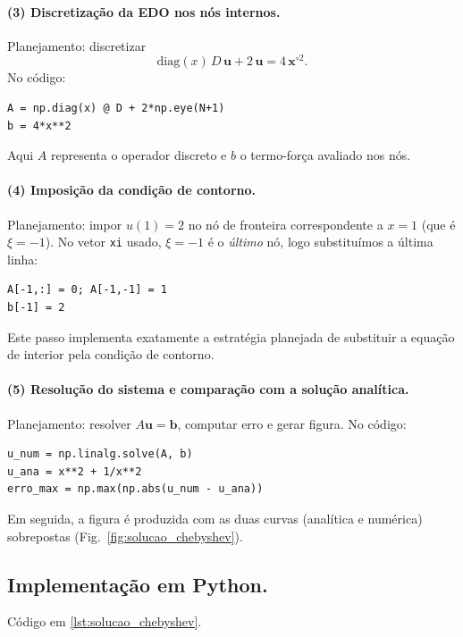 \documentclass[11pt,a4paper]{article}
\begin{document}
\paragraph{(3) Discretização da EDO nos nós internos.}
Planejamento: discretizar
\[
\mathrm{diag}(x)\,D\,\mathbf{u} + 2\,\mathbf{u} = 4\,\mathbf{x}^{\circ 2}.
\]
No código:
\begin{verbatim}
A = np.diag(x) @ D + 2*np.eye(N+1)
b = 4*x**2
\end{verbatim}
Aqui $A$ representa o operador discreto e $b$ o termo-força avaliado nos nós.

\paragraph{(4) Imposição da condição de contorno.}
Planejamento: impor $u(1)=2$ no nó de fronteira correspondente a $x=1$ (que é $\xi=-1$). No vetor \texttt{xi} usado, $\xi=-1$ é o \emph{último} nó, logo substituímos a última linha:
\begin{verbatim}
A[-1,:] = 0; A[-1,-1] = 1
b[-1] = 2
\end{verbatim}
Este passo implementa exatamente a estratégia planejada de substituir a equação de interior pela condição de contorno.

\paragraph{(5) Resolução do sistema e comparação com a solução analítica.}
Planejamento: resolver $A\mathbf{u}=\mathbf{b}$, computar erro e gerar figura.
No código:
\begin{verbatim}
u_num = np.linalg.solve(A, b)
u_ana = x**2 + 1/x**2
erro_max = np.max(np.abs(u_num - u_ana))
\end{verbatim}
Em seguida, a figura é produzida com as duas curvas (analítica e numérica) sobrepostas (Fig.~\ref{fig:solucao_chebyshev}).

\subsection{Implementação em Python.}

Código em \ref{lst:solucao_chebyshev}.

\end{document}

